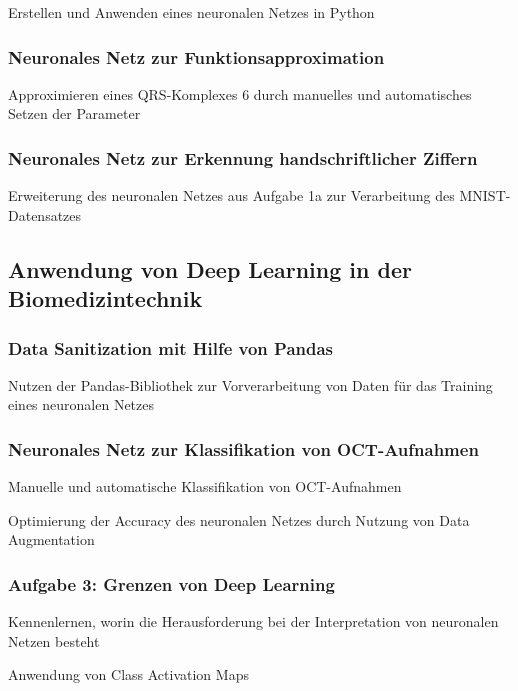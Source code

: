 \documentclass[a4paper,12pt,titlepage]{scrartcl}
\begin{document}
Erstellen und Anwenden eines neuronalen Netzes in Python

\subsubsection{Neuronales Netz zur Funktionsapproximation}
Approximieren eines QRS-Komplexes 6 durch manuelles und automatisches Setzen der Parameter

\subsubsection{Neuronales Netz zur Erkennung handschriftlicher Ziffern}
Erweiterung des neuronalen Netzes aus Aufgabe 1a zur Verarbeitung des MNIST-Datensatzes

\subsection{Anwendung von Deep Learning in der Biomedizintechnik}
\subsubsection{Data Sanitization mit Hilfe von Pandas}
Nutzen der Pandas-Bibliothek zur Vorverarbeitung von Daten für das Training eines neuronalen Netzes

\subsubsection{Neuronales Netz zur Klassifikation von OCT-Aufnahmen}
Manuelle und automatische Klassifikation von OCT-Aufnahmen

Optimierung der Accuracy des neuronalen Netzes durch Nutzung von Data Augmentation

\subsubsection{Aufgabe 3: Grenzen von Deep Learning}
Kennenlernen, worin die Herausforderung bei der Interpretation von neuronalen Netzen besteht

Anwendung von Class Activation Maps
\end{document}

